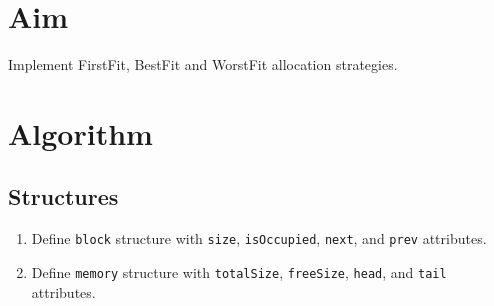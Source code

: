 
\section{Aim}
Implement FirstFit, BestFit and WorstFit allocation strategies.

\section{Algorithm}

 {\selectfont
  \subsection{Structures}
  \begin{enumerate}[label=\arabic*.,left=0pt]
    \item Define \texttt{block} structure with \texttt{size}, \texttt{isOccupied}, \texttt{next}, and \texttt{prev} attributes.
    \item Define \texttt{memory} structure with \texttt{totalSize}, \texttt{freeSize}, \texttt{head}, and \texttt{tail} attributes.
  \end{enumerate}

}
